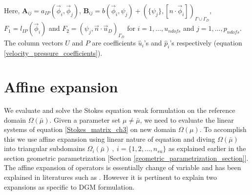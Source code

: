 \documentclass[graybox]{svmult}
\begin{document}
Here, $\bm{A}_{ij} = a_{IP} (\overrightarrow{\phi}_i,\overrightarrow{\phi}_j)$, $\bm{B}_{ij} = b(\overrightarrow{\phi}_i,\psi_j) + \left( \lbrace \psi_j \rbrace , [n \cdot \overrightarrow{\phi}_i]\right)_{\Gamma \cup \Gamma_D}$, $F_1 = l_{IP}(\overrightarrow{\phi}_i)$ and $F_2 = \left( \psi_j,\overrightarrow{n} \cdot \overrightarrow{u}_D \right)_{\Gamma_D}$ for $i=1,\ldots,u_{ndofs}$ and $j=1,\ldots,p_{ndofs}$. The column vectors $U$ and $P$ are coefficients $\hat{u}_i$'s and $\hat{p}_i$'s respectively (equation \eqref{velocity_pressure_coefficients}).

\section{Affine expansion}

We evaluate and solve the Stokes equation weak formulation on the reference domain $\Omega({\bar{\mu}})$. Given a parameter set $\mu \neq \bar{\mu}$, we need to evaluate the linear systems of equation \eqref{Stokes_matrix_ch3} on new domain $\Omega(\mu)$. To accomplish this we use affine expansion using linear nature of equation and diving $\Omega(\bar{\mu})$ into triangular subdomains $\Omega_i(\bar{\mu}) \ , \ i = \lbrace 1,2,\ldots,n_{su} \rbrace$ as explained earlier in the section geometric parametrization [Section \ref{geometric_parametrization_section}]. The affine expansion of operators is essentially change of variable and has been explained in literatures such as \cite{CRBM}. However it is pertinent to explain two expansions as specific to DGM formulation.
\end{document}
